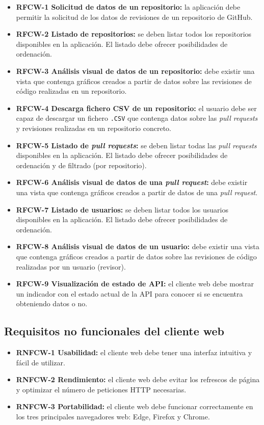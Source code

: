 \begin{itemize}
	\item \textbf{RFCW-1 Solicitud de datos de un repositorio:} la aplicación debe permitir la solicitud de los datos de revisiones de un repositorio de GitHub.
	\item \textbf{RFCW-2 Listado de repositorios:} se deben listar todos los repositorios disponibles en la aplicación. El listado debe ofrecer posibilidades de ordenación.
	\item \textbf{RFCW-3 Análisis visual de datos de un repositorio:} debe existir una vista que contenga gráficos creados a partir de datos sobre las revisiones de código realizadas en un repositorio.
	\item \textbf{RFCW-4 Descarga fichero CSV de un repositorio:} el usuario debe ser capaz de descargar un fichero \texttt{.CSV} que contenga datos sobre las \textit{pull requests} y revisiones realizadas en un repositorio concreto.
	\item \textbf{RFCW-5 Listado de \textit{pull requests}:} se deben listar todas las \textit{pull requests} disponibles en la aplicación. El listado debe ofrecer posibilidades de ordenación y de filtrado (por repositorio).
	\item \textbf{RFCW-6 Análisis visual de datos de una \textit{pull request}:}  debe existir una vista que contenga gráficos creados a partir de datos de una \textit{pull request}.
	\item \textbf{RFCW-7 Listado de usuarios:} se deben listar todos los usuarios disponibles en la aplicación. El listado debe ofrecer posibilidades de ordenación.
	\item \textbf{RFCW-8 Análisis visual de datos de un usuario:} debe existir una vista que contenga gráficos creados a partir de datos sobre las revisiones de código realizadas por un usuario (revisor).
	\item \textbf{RFCW-9 Visualización de estado de API:} el cliente web debe mostrar un indicador con el estado actual de la API para conocer si se encuentra obteniendo datos o no.
\end{itemize}

\subsection{Requisitos no funcionales del cliente web}

\begin{itemize}
	\item \textbf{RNFCW-1 Usabilidad:} el cliente web debe tener una interfaz intuitiva y fácil de utilizar.
	\item \textbf{RNFCW-2 Rendimiento:} el cliente web debe evitar los refrescos de página y optimizar el número de peticiones HTTP necesarias.
	\item \textbf{RNFCW-3 Portabilidad:} el cliente web debe funcionar correctamente en los tres principales navegadores web: Edge, Firefox y Chrome.
\end{itemize}

